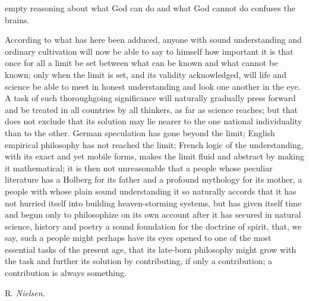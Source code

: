 \documentclass[12pt,a4paper,openany]{book}
\newcommand{\opage}[1]{\marginnote{\footnotesize\textit{[#1]}}}
\newcommand{\signature}[1]{\par\smallskip\hfill #1\hspace*{2em}\par}
\begin{document}
empty reasoning about what God can do and what
God cannot do confuses the brains.

According to what has here been adduced, anyone with sound
understanding and ordinary cultivation will now be able to say to himself
\setcounter{footnote}{0}%
\opage{404}how important it is that once for all a
limit be set between what can be known and what cannot
be known; only when the limit is set, and its validity
acknowledged, will life and science be able to meet
in honest understanding and look one another in the eye. A task
of such thoroughgoing significance will naturally
gradually press forward and be treated in all
countries by all thinkers, as far as science
reaches; but that does not exclude that its solution may
lie nearer to the one national individuality than to the other.
German speculation has gone beyond the limit;
English empirical philosophy has not reached the limit;
French logic of the understanding, with its exact and yet
mobile forms, makes the limit fluid and abstract by
making it mathematical; it is then not unreasonable that
a people whose peculiar literature has a Holberg
for its father and a profound mythology for its mother, a people
with whose plain sound understanding it so naturally accords
that it has not hurried itself into building heaven-storming
systems, but has given itself time and begun only
to philosophize on its own account after it has secured in natural science,
history and poetry a sound
foundation for the doctrine of spirit, that, we say, such a people
might perhaps have its eyes opened to one of the most essential
tasks of the present age, that its late-born philosophy might grow
with the task and further its solution by contributing, if
only a contribution; a contribution is always something.
\signature{R. \emph{Nielsen}.}
\end{document}
